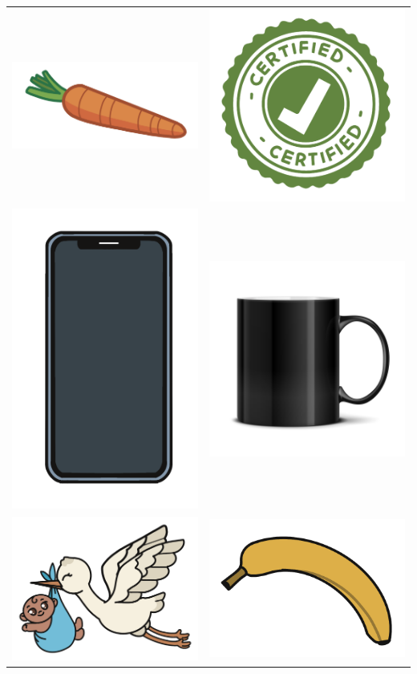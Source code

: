 \begin{center}
\begin{tabular}{ll}
\includegraphics[width=.45\textwidth]{media/image105.png} & \includegraphics[width=.35\textwidth]{media/image106.png} \\
\includegraphics[width=.3\textwidth]{media/image107.png} & \includegraphics[width=.4\textwidth]{media/image108.jpg} \\
\includegraphics[width=.4\textwidth]{media/image109.png} & \includegraphics[width=.4\textwidth]{media/image100.png}

\end{tabular}
\end{center}
